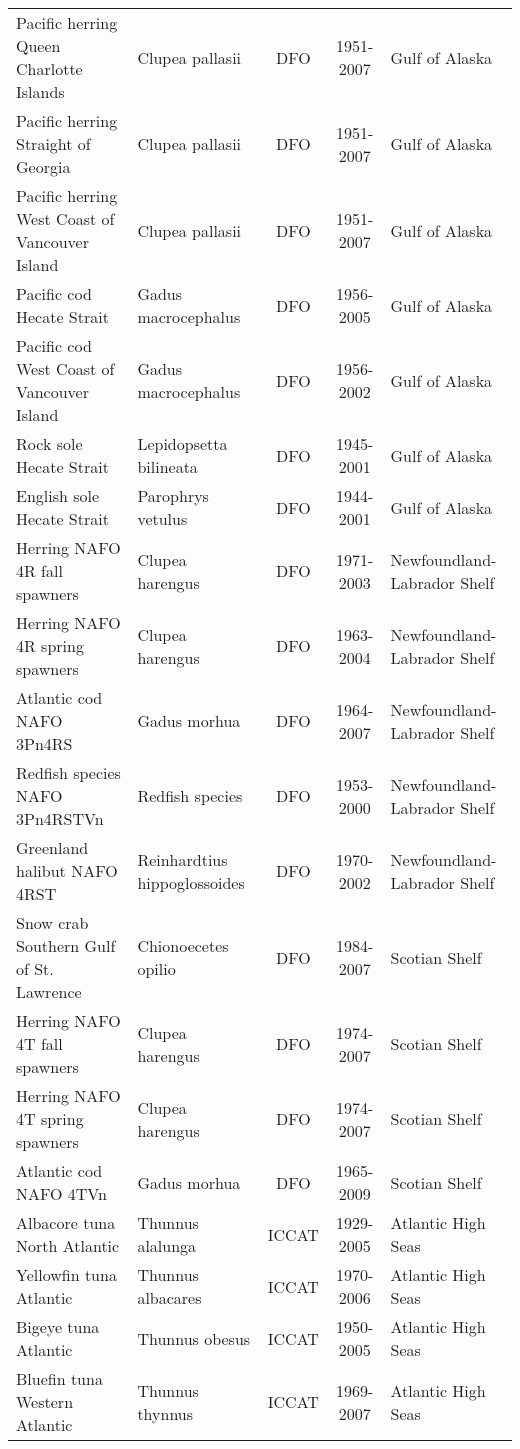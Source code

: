 \begin{longtable}{p{4cm}p{3.5cm}ccp{5.5cm}}
  Pacific herring Queen Charlotte Islands & Clupea pallasii & DFO & 1951-2007 & Gulf of Alaska \\ 
  Pacific herring Straight of Georgia & Clupea pallasii & DFO & 1951-2007 & Gulf of Alaska \\ 
  Pacific herring West Coast of Vancouver Island & Clupea pallasii & DFO & 1951-2007 & Gulf of Alaska \\ 
  Pacific cod Hecate Strait & Gadus macrocephalus & DFO & 1956-2005 & Gulf of Alaska \\ 
  Pacific cod West Coast of Vancouver Island & Gadus macrocephalus & DFO & 1956-2002 & Gulf of Alaska \\ 
  Rock sole Hecate Strait & Lepidopsetta bilineata & DFO & 1945-2001 & Gulf of Alaska \\ 
  English sole Hecate Strait & Parophrys vetulus & DFO & 1944-2001 & Gulf of Alaska \\ 
  Herring NAFO 4R fall spawners & Clupea harengus & DFO & 1971-2003 & Newfoundland-Labrador Shelf \\ 
  Herring NAFO 4R spring spawners & Clupea harengus & DFO & 1963-2004 & Newfoundland-Labrador Shelf \\ 
  Atlantic cod NAFO 3Pn4RS & Gadus morhua & DFO & 1964-2007 & Newfoundland-Labrador Shelf \\ 
  Redfish species NAFO 3Pn4RSTVn & Redfish species & DFO & 1953-2000 & Newfoundland-Labrador Shelf \\ 
  Greenland halibut NAFO 4RST & Reinhardtius hippoglossoides & DFO & 1970-2002 & Newfoundland-Labrador Shelf \\ 
  Snow crab Southern Gulf of St. Lawrence & Chionoecetes opilio & DFO & 1984-2007 & Scotian Shelf \\ 
  Herring NAFO 4T fall spawners & Clupea harengus & DFO & 1974-2007 & Scotian Shelf \\ 
  Herring NAFO 4T spring spawners & Clupea harengus & DFO & 1974-2007 & Scotian Shelf \\ 
  Atlantic cod NAFO 4TVn & Gadus morhua & DFO & 1965-2009 & Scotian Shelf \\ 
  Albacore tuna North Atlantic & Thunnus alalunga & ICCAT & 1929-2005 & Atlantic High Seas \\ 
  Yellowfin tuna Atlantic & Thunnus albacares & ICCAT & 1970-2006 & Atlantic High Seas \\ 
  Bigeye tuna Atlantic & Thunnus obesus & ICCAT & 1950-2005 & Atlantic High Seas \\ 
  Bluefin tuna Western Atlantic & Thunnus thynnus & ICCAT & 1969-2007 & Atlantic High Seas \\ 

\end{longtable}
